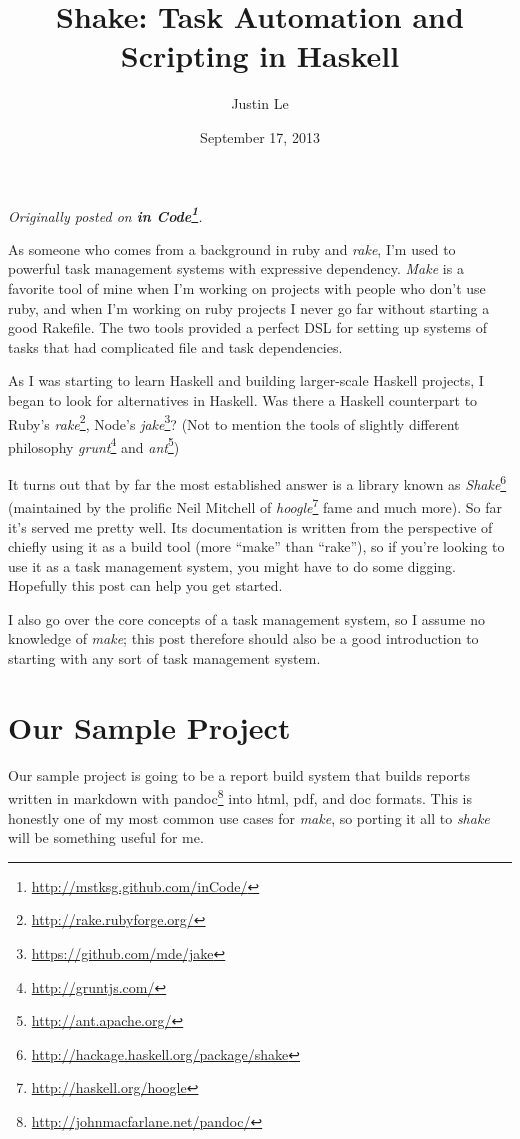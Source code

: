 \documentclass[]{article}
\title{Shake: Task Automation and Scripting in Haskell}
\author{Justin Le}
\date{September 17, 2013}
\renewcommand{\href}[2]{#2\footnote{\url{#1}}}
\begin{document}
\maketitle

\emph{Originally posted on
\textbf{\href{http://mstksg.github.com/inCode/}{in Code}}.}

As someone who comes from a background in ruby and \emph{rake}, I'm used
to powerful task management systems with expressive dependency.
\emph{Make} is a favorite tool of mine when I'm working on projects with
people who don't use ruby, and when I'm working on ruby projects I never
go far without starting a good Rakefile. The two tools provided a
perfect DSL for setting up systems of tasks that had complicated file
and task dependencies.

As I was starting to learn Haskell and building larger-scale Haskell
projects, I began to look for alternatives in Haskell. Was there a
Haskell counterpart to Ruby's
\href{http://rake.rubyforge.org/}{\emph{rake}}, Node's
\href{https://github.com/mde/jake}{\emph{jake}}? (Not to mention the
tools of slightly different philosophy
\href{http://gruntjs.com/}{\emph{grunt}} and
\href{http://ant.apache.org/}{\emph{ant}})

It turns out that by far the most established answer is a library known
as \href{http://hackage.haskell.org/package/shake}{\emph{Shake}}
(maintained by the prolific Neil Mitchell of
\href{http://haskell.org/hoogle}{\emph{hoogle}} fame and much more). So
far it's served me pretty well. Its documentation is written from the
perspective of chiefly using it as a build tool (more ``make'' than
``rake''), so if you're looking to use it as a task management system,
you might have to do some digging. Hopefully this post can help you get
started.

I also go over the core concepts of a task management system, so I
assume no knowledge of \emph{make}; this post therefore should also be a
good introduction to starting with any sort of task management system.

\section{Our Sample Project}\label{our-sample-project}

Our sample project is going to be a report build system that builds
reports written in markdown with
\href{http://johnmacfarlane.net/pandoc/}{pandoc} into html, pdf, and doc
formats. This is honestly one of my most common use cases for
\emph{make}, so porting it all to \emph{shake} will be something useful
for me.
\end{document}
